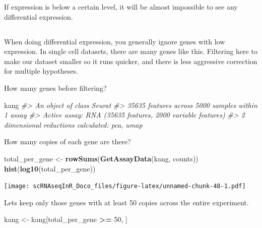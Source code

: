 \documentclass[
]{book}
\newenvironment{Shaded}{\begin{snugshade}}{\end{snugshade}}
\newcommand{\CommentTok}[1]{\textcolor[rgb]{0.56,0.35,0.01}{\textit{#1}}}
\newcommand{\DecValTok}[1]{\textcolor[rgb]{0.00,0.00,0.81}{#1}}
\newcommand{\FunctionTok}[1]{\textcolor[rgb]{0.13,0.29,0.53}{\textbf{#1}}}
\newcommand{\NormalTok}[1]{#1}
\newcommand{\OtherTok}[1]{\textcolor[rgb]{0.56,0.35,0.01}{#1}}
\newcommand{\SpecialCharTok}[1]{\textcolor[rgb]{0.81,0.36,0.00}{\textbf{#1}}}
\newcommand{\StringTok}[1]{\textcolor[rgb]{0.31,0.60,0.02}{#1}}
\begin{document}
If expression is below a certain level, it will be almost impossible to see any differential expression.

\hypertarget{section-2}{%
\subsection*{}\label{section-2}}

When doing differential expression, you generally ignore genes with low expression.
In single cell datasets, there are many genes like this. Filtering here to make our dataset smaller so it runs quicker, and there is less aggressive correction for multiple hypotheses.

How many genes before filtering?

\begin{Shaded}
\begin{Highlighting}[]
\NormalTok{kang}
\CommentTok{\#\textgreater{} An object of class Seurat }
\CommentTok{\#\textgreater{} 35635 features across 5000 samples within 1 assay }
\CommentTok{\#\textgreater{} Active assay: RNA (35635 features, 2000 variable features)}
\CommentTok{\#\textgreater{}  2 dimensional reductions calculated: pca, umap}
\end{Highlighting}
\end{Shaded}

How many copies of each gene are there?

\begin{Shaded}
\begin{Highlighting}[]
\NormalTok{total\_per\_gene }\OtherTok{\textless{}{-}} \FunctionTok{rowSums}\NormalTok{(}\FunctionTok{GetAssayData}\NormalTok{(kang, }\StringTok{\textquotesingle{}counts\textquotesingle{}}\NormalTok{))}
\FunctionTok{hist}\NormalTok{(}\FunctionTok{log10}\NormalTok{(total\_per\_gene))}
\end{Highlighting}
\end{Shaded}

\texttt{[image: scRNAseqInR\_Doco\_files/figure-latex/unnamed-chunk-48-1.pdf]}

Lets keep only those genes with at least 50 copies across the entire experiment.

\begin{Shaded}
\begin{Highlighting}[]
\NormalTok{kang }\OtherTok{\textless{}{-}}\NormalTok{ kang[total\_per\_gene }\SpecialCharTok{\textgreater{}=} \DecValTok{50}\NormalTok{, ] }
\end{Highlighting}
\end{Shaded}
\end{document}
